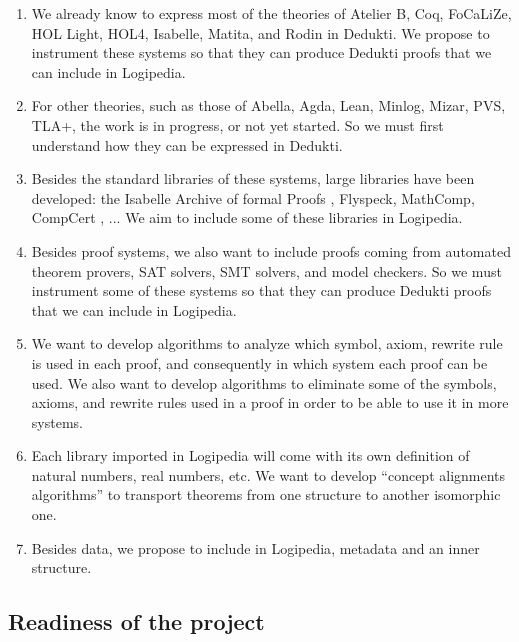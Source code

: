 \begin{enumerate}
\item We already know to express most of the theories of {\sc Atelier B},
{\sc Coq}, {\sc FoCaLiZe}, {\sc HOL Light}, {\sc HOL4}, {\sc
Isabelle}, {\sc Matita}, and {\sc Rodin} in {\sc Dedukti}. We propose
to instrument these systems so that they can produce {\sc Dedukti}
proofs that we can include in {\sc Logipedia}.

\item
For other theories, such as those of {\sc Abella}, {\sc Agda}, {\sc
Lean}, {\sc Minlog}, {\sc Mizar}, {\sc PVS}, {\sc TLA+}, the work is
in progress, or not yet started.  So we must first understand how they
can be expressed in {\sc Dedukti}.

\item Besides the standard libraries of these systems, large libraries
  have been developed: the {\sc Isabelle Archive of formal Proofs} \cite{AFP},
  {\sc Flyspeck}\cite{Flyspeck}, {\sc MathComp}\cite{Mathcomp}, 
{\sc CompCert} \cite{Compcert}, ...  We aim to include
  some of these libraries in {\sc Logipedia}.
  
\item
Besides proof systems, we also want to include proofs coming from
automated theorem provers, SAT solvers, SMT solvers, and model
checkers.  So we must instrument some of these systems so that they
can produce {\sc Dedukti} proofs that we can include in {\sc
Logipedia}.

\item
We want to develop algorithms to analyze which symbol, axiom, rewrite
rule is used in each proof, and consequently in which system each proof
can be used. We also want to develop algorithms to eliminate some of the 
symbols, axioms, and rewrite rules used in a proof in order to be able to 
use it in more systems.


\item
Each library imported in {\sc Logipedia} will come with its own
definition of natural numbers, real numbers, etc. We want to develop
``concept alignments algorithms'' to transport theorems from one
structure to another isomorphic one.

\item 
Besides data, we propose to include in {\sc Logipedia}, metadata and
an inner structure.
\end{enumerate}


\subsection{Readiness of the project}

